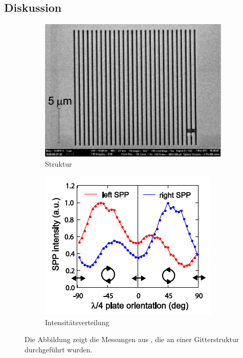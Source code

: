 \documentclass[titlepage,  ngerman]{article}
\begin{document}
	\subsection{Diskussion}
	
	
	\begin{figure}
		\label{fig:RF_measure}
		\centering
		\begin{subfigure}[b]{0.5\textwidth}
			\centering
			\includegraphics[width=\textwidth]{figures/RF_SM_Slits.pdf}
			\caption{Struktur}
			\label{fig:RF_measure_slits}
		\end{subfigure}
		\hfill
		\begin{subfigure}[b]{0.49\textwidth}
			\centering
			\includegraphics[width=\textwidth]{figures/RF_SM_Intensity.pdf}
			\caption{Intensitätsverteilung}
			\label{fig:RF_measure_int}
		\end{subfigure}
		\caption[Vergleichsmessung von \cite{RodriguezFortuno.2013}]{Die Abbildung zeigt die Messungen aus \cite{RodriguezFortuno.2013}, die an einer Gitterstruktur durchgeführt wurden.}			
	\end{figure}
	
\end{document}
